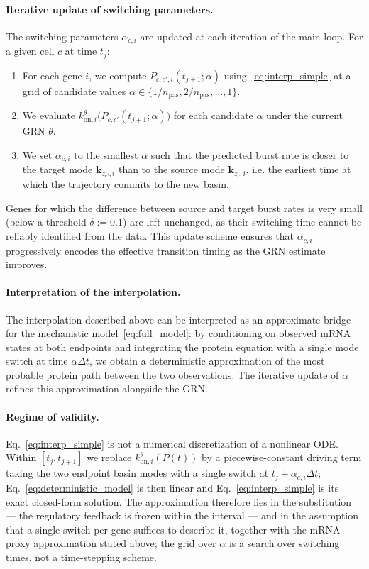 \documentclass[a4paper, 11pt]{article}
\theoremstyle{plain}
\theoremstyle{remark}
\newcommand*{\firstreview}[1]{{\color{black}#1}}
\begin{document}
\begin{appendices}
\paragraph{Iterative update of switching parameters.}
The switching parameters $\alpha_{c,i}$ are updated at each iteration of the main loop. For a given cell $c$ at time $t_j$:
\begin{enumerate}
    \item For each gene $i$, we compute $P_{c,c',i}(t_{j+1}; \alpha)$ using~\eqref{eq:interp_simple} at a grid of candidate values $\alpha \in \{1/n_{\mathrm{pas}}, 2/n_{\mathrm{pas}}, \dots, 1\}$.
    \item We evaluate $k^{\theta}_{\mathrm{on},i}\bigl(P_{c,c'}(t_{j+1};\alpha)\bigr)$ for each candidate $\alpha$ under the current GRN $\theta$.
    \item We set $\alpha_{c,i}$ to the smallest $\alpha$ such that the predicted burst rate is closer to the target mode $\mathbf{k}_{z_{c'},i}$ than to the source mode $\mathbf{k}_{z_c,i}$, i.e. the earliest time at which the trajectory commits to the new basin.
\end{enumerate}
Genes for which the difference between source and target burst rates is very small (below a threshold $\delta := 0.1$) are left unchanged, as their switching time cannot be reliably identified from the data. This update scheme ensures that $\alpha_{c,i}$ progressively encodes the effective transition timing as the GRN estimate improves.

\paragraph{Interpretation of the interpolation.}
The interpolation described above can be interpreted as an approximate bridge for the mechanistic model~\eqref{eq:full_model}: by conditioning on observed mRNA states at both endpoints and integrating the protein equation with a single mode switch at time $\alpha\Delta t$, we obtain a deterministic approximation of the most probable protein path between the two observations. The iterative update of $\alpha$ refines this approximation alongside the GRN.

\paragraph{Regime of validity.}
\firstreview{Eq.~\eqref{eq:interp_simple} is not a numerical discretization of a nonlinear ODE.
Within $[t_j,t_{j+1}]$ we replace $k^{\theta}_{\mathrm{on},i}(P(t))$ by a piecewise-constant
driving term taking the two endpoint basin modes with a single switch at
$t_j+\alpha_{c,i}\Delta t$; Eq.~\eqref{eq:deterministic_model} is then linear and
Eq.~\eqref{eq:interp_simple} is its exact closed-form solution. The approximation therefore lies
in the substitution --- the regulatory feedback is frozen within the interval --- and in the
assumption that a single switch per gene suffices to describe it, together with the mRNA-proxy
approximation stated above; the grid over $\alpha$ is a search over switching times, not a
time-stepping scheme.}


\end{appendices}
\end{document}
